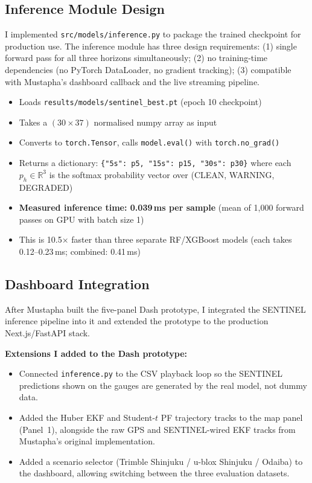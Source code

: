\documentclass[12pt,a4paper]{article}
\newcommand{\code}[1]{\texttt{#1}}
\begin{document}
\subsection{Inference Module Design}

I implemented \code{src/models/inference.py} to package the trained checkpoint for
production use.
The inference module has three design requirements:
(1) single forward pass for all three horizons simultaneously;
(2) no training-time dependencies (no PyTorch DataLoader, no gradient tracking);
(3) compatible with Mustapha's dashboard callback and the live streaming pipeline.

\begin{itemize}
  \item Loads \code{results/models/sentinel\_best.pt} (epoch 10 checkpoint)
  \item Takes a $(30 \times 37)$ normalised numpy array as input
  \item Converts to \code{torch.Tensor}, calls \code{model.eval()} with
    \code{torch.no\_grad()}
  \item Returns a dictionary:
    \code{\{"5s": p5, "15s": p15, "30s": p30\}} where each $p_h \in \mathbb{R}^3$
    is the softmax probability vector over (CLEAN, WARNING, DEGRADED)
  \item \textbf{Measured inference time: 0.039\,ms per sample}
    (mean of 1,000 forward passes on GPU with batch size 1)
  \item This is 10.5$\times$ faster than three separate RF/XGBoost models
    (each takes 0.12--0.23\,ms; combined: 0.41\,ms)
\end{itemize}

\subsection{Dashboard Integration}

After Mustapha built the five-panel Dash prototype, I integrated the SENTINEL inference
pipeline into it and extended the prototype to the production Next.js/FastAPI stack.

\textbf{Extensions I added to the Dash prototype:}
\begin{itemize}
  \item Connected \code{inference.py} to the CSV playback loop so the SENTINEL
    predictions shown on the gauges are generated by the real model, not dummy data.
  \item Added the Huber EKF and Student-$t$ PF trajectory tracks to the map panel
    (Panel~1), alongside the raw GPS and SENTINEL-wired EKF tracks from Mustapha's
    original implementation.
  \item Added a scenario selector (Trimble Shinjuku / u-blox Shinjuku / Odaiba) to
    the dashboard, allowing switching between the three evaluation datasets.
\end{itemize}
\end{document}
